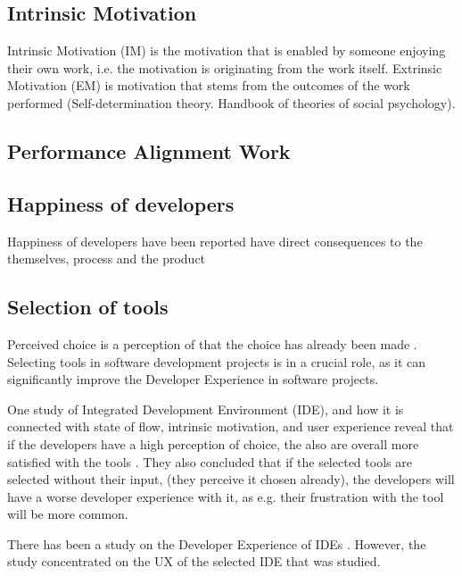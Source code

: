 \documentclass[english, 12pt, a4paper, sci, utf8, a-1b, online]{aaltothesis}
\begin{document}
\subsection{Intrinsic Motivation}

Intrinsic Motivation (IM) is the motivation that is enabled by someone enjoying their own work, i.e. the motivation is originating from the work itself. Extrinsic Motivation (EM) is motivation that stems from the outcomes of the work performed \cite{kuusinen-flow} (Self-determination theory. Handbook of theories of social psychology).

\subsection{Performance Alignment Work}


\subsection{Happiness of developers}

Happiness of developers have been reported have direct consequences to the themselves, process and the product \cite{unhappy-developers}

\subsection{Selection of tools}

Perceived choice is a perception of that the choice has already been made \cite{kuusinen-flow}. Selecting tools in software development projects is in a crucial role, as it can significantly improve the Developer Experience in software projects.

One study of Integrated Development Environment (IDE), and how it is connected with state of flow, intrinsic motivation, and user experience reveal that if the developers have a high perception of choice, the also are overall more satisfied with the tools \cite{kuusinen-flow}. They also concluded that if the selected tools are selected without their input, (they perceive it chosen already), the developers will have a worse developer experience with it, as e.g. their frustration with the tool will be more common.

There has been a study on the Developer Experience of IDEs \cite{software-developers-as-users}. However, the study concentrated on the UX of the selected IDE that was studied.
\end{document}
